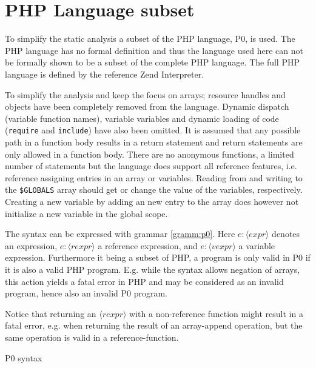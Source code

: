 \section{PHP Language subset}
\newcommand{\syn}[1]{\langle\mathit{#1}\rangle}
\label{sec:langsubset}
To simplify the static analysis a subset of the PHP language, P0, is used. The PHP language has no formal definition and thus the language used here can not be formally shown to be a subset of the complete PHP language. The full PHP language is defined by the reference Zend Interpreter.

To simplify the analysis and keep the focus on arrays; resource handles and objects have been completely removed from the language. Dynamic dispatch (variable function names), variable variables and dynamic loading of code (\texttt{require} and \texttt{include}) have also been omitted. It is assumed that any possible path in a function body results in a return statement and return statements are only allowed in a function body. There are no anonymous functions, a limited number of statements but the language does support all reference features, i.e. reference assigning entries in an array or variables. Reading from and writing to the \texttt{\$GLOBALS} array should get or change the value of the variables, respectively. Creating a new variable by adding an new entry to the array does however not initialize a new variable in the global scope.

The syntax can be expressed with grammar \ref{gramm:p0}. Here $e : \syn{expr}$ denotes an expression, $e : \syn{rexpr}$ a reference expression, and $e : \syn{vexpr}$ a variable expression.   Furthermore it being a subset of PHP, a program is only valid in P0  if it is also a valid PHP program. E.g. while the syntax allows negation of arrays, this action yields a fatal error in PHP and may be considered as an invalid program, hence also an invalid P0 program. 

Notice that returning an $\syn{rexpr}$ with a non-reference function might result in a fatal error, e.g. when returning the result of an array-append operation, but the same operation is valid in a reference-function.  





\begin{grammarf}
\centering

\caption{P0 syntax }
\label{gramm:p0}
\end{grammarf}